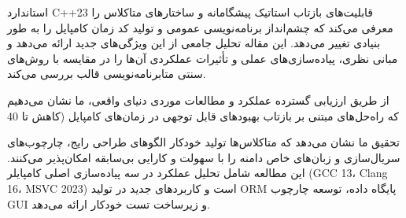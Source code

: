 \tableofcontents
\newpage

\begin{abstractbox}
استاندارد C++23 قابلیت‌های بازتاب استاتیک پیشگامانه و ساختارهای متاکلاس را معرفی می‌کند که چشم‌انداز برنامه‌نویسی عمومی و تولید کد زمان کامپایل را به طور بنیادی تغییر می‌دهد. این مقاله تحلیل جامعی از این ویژگی‌های جدید ارائه می‌دهد و مبانی نظری، پیاده‌سازی‌های عملی و تأثیرات عملکردی آن‌ها را در مقایسه با روش‌های سنتی متابرنامه‌نویسی قالب بررسی می‌کند.

از طریق ارزیابی گسترده عملکرد و مطالعات موردی دنیای واقعی، ما نشان می‌دهیم که راه‌حل‌های مبتنی بر بازتاب بهبودهای قابل توجهی در زمان‌های کامپایل (کاهش تا 40%

تحقیق ما نشان می‌دهد که متاکلاس‌ها تولید خودکار الگوهای طراحی رایج، چارچوب‌های سریال‌سازی و زبان‌های خاص دامنه را با سهولت و کارایی بی‌سابقه امکان‌پذیر می‌کنند. این مطالعه شامل تحلیل عملکرد در سه پیاده‌سازی اصلی کامپایلر (GCC 13، Clang 16، MSVC 2023) است و کاربردهای جدید در تولید ORM پایگاه داده، توسعه چارچوب GUI و زیرساخت تست خودکار ارائه می‌دهد.
\end{abstractbox}

\newpage
